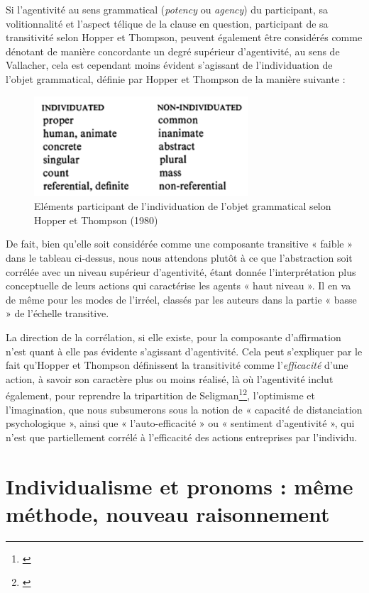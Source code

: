 Si l’agentivité au sens grammatical (\textit{potency} ou \textit{agency}) du participant, sa volitionnalité et l’aspect télique de la clause en question, participant de sa transitivité selon Hopper et Thompson, peuvent également être considérés comme dénotant de manière concordante un degré supérieur d’agentivité, au sens de Vallacher, cela est cependant moins évident s'agissant de l'individuation de l'objet grammatical, définie par Hopper et Thompson de la manière suivante :

\begin{figure}[!ht]
    \centering
    \includegraphics[width=8cm]{img/Hopper_individuation.png}
    \caption{Eléments participant de l'individuation de l'objet grammatical selon Hopper et Thompson (1980)}
    \label{Hopper_individuation}
\end{figure}

De fait, bien qu'elle soit considérée comme une composante transitive « faible » dans le tableau ci-dessus, nous nous attendons plutôt à ce que l'abstraction soit corrélée avec un niveau supérieur d’agentivité, étant donnée l’interprétation plus conceptuelle de leurs actions qui caractérise les agents « haut niveau ». Il en va de même pour les modes de l’irréel, classés par les auteurs dans la partie « basse » de l’échelle transitive. 

La direction de la corrélation, si elle existe, pour la composante d'affirmation n'est quant à elle pas évidente s’agissant d’agentivité. Cela peut s'expliquer par le fait qu’Hopper et Thompson définissent la transitivité comme l'\textit{efficacité} d'une action, à savoir son caractère plus ou moins réalisé, là où l’agentivité inclut également, pour reprendre la tripartition de Seligman\footnote{\cite{seligman_psychological_2023}}\footnote{\cite{seligman_psychological_2023}}, l'optimisme et l'imagination, que nous subsumerons sous la notion de « capacité de distanciation psychologique », ainsi que « l'auto-efficacité » ou « sentiment d’agentivité », qui n’est que partiellement corrélé à l’efficacité des actions entreprises par l’individu.

\section{Individualisme et pronoms : même méthode, nouveau raisonnement}

